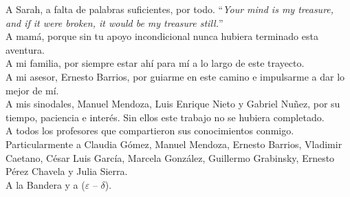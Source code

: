 \documentclass[11pt]{book}
\begin{document}
A Sarah, a falta de palabras suficientes, por todo. ``\textit{Your mind is my treasure, and if it were broken, it would be my treasure still.}''
\\

A mamá, porque sin tu apoyo incondicional nunca hubiera terminado esta aventura. \\


A mi familia, por siempre estar ahí para mí a lo largo de este trayecto. \\


A mi asesor, Ernesto Barrios, por guiarme en este camino e impulsarme a dar lo mejor de mí. \\

A mis sinodales, Manuel Mendoza, Luis Enrique Nieto y Gabriel Nuñez, por su tiempo, paciencia e interés. Sin ellos este trabajo no se hubiera completado. \\

A todos los profesores que compartieron sus conocimientos conmigo. Particularmente a Claudia Gómez, Manuel Mendoza, Ernesto Barrios, Vladimir Caetano, César Luis García, Marcela González, Guillermo Grabinsky, \newline Ernesto Pérez Chavela y Julia Sierra. \\


A la Bandera y a ($\varepsilon$ -- $\delta$). \\





\tableofcontents







\mainmatter %
\pagestyle{headings}








\end{document}

